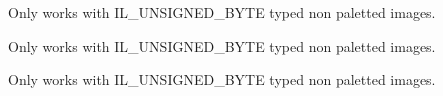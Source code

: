 
\begin{DoxyRefList}
\item[\label{bug__bug000001}%
\hypertarget{bug__bug000001}{}%
Global \hyperlink{group__ilu__filter_gacb6e1a0e8dc10748f1cfbf60b1f8c350}{ilu\-Alienify} (void)]Only works with I\-L\-\_\-\-U\-N\-S\-I\-G\-N\-E\-D\-\_\-\-B\-Y\-T\-E typed non paletted images.


\item[\label{bug__bug000002}%
\hypertarget{bug__bug000002}{}%
Global \hyperlink{group__ilu__colour_ga1c019783a7ab60a1b9fee1ed5b2aadbe}{ilu\-Colours\-Used} ()]Only works with I\-L\-\_\-\-U\-N\-S\-I\-G\-N\-E\-D\-\_\-\-B\-Y\-T\-E typed non paletted images.


\item[\label{bug__bug000003}%
\hypertarget{bug__bug000003}{}%
Global \hyperlink{group__ilu__colour_ga674c6a79168815f579338c30e94cd086}{ilu\-Contrast} (I\-Lfloat Contrast)]Only works with I\-L\-\_\-\-U\-N\-S\-I\-G\-N\-E\-D\-\_\-\-B\-Y\-T\-E typed non paletted images.


\end{DoxyRefList}